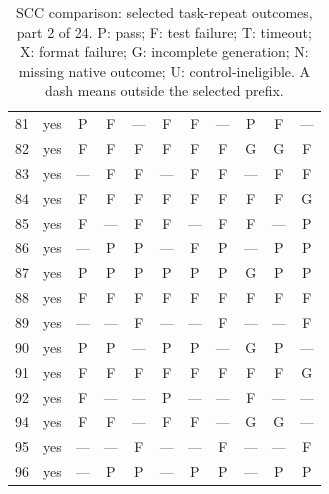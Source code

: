 \begin{table}[p]
\begin{tabular*}{\textwidth}{@{\extracolsep{\fill}}rc*{9}{c}@{}}
81 & yes & P & F & — & F & F & — & P & F & —\\
82 & yes & F & F & F & F & F & F & G & G & F\\
83 & yes & — & F & F & — & F & F & — & F & F\\
84 & yes & F & F & F & F & F & F & F & F & G\\
85 & yes & F & — & F & F & — & F & F & — & P\\
86 & yes & — & P & P & — & F & P & — & P & P\\
87 & yes & P & P & P & P & P & P & G & P & P\\
88 & yes & F & F & F & F & F & F & F & F & F\\
89 & yes & — & — & F & — & — & F & — & — & F\\
90 & yes & P & P & — & P & P & — & G & P & —\\
91 & yes & F & F & F & F & F & F & F & F & G\\
92 & yes & F & — & — & P & — & — & F & — & —\\
94 & yes & F & F & — & F & F & — & G & G & —\\
95 & yes & — & — & F & — & — & F & — & — & F\\
96 & yes & — & P & P & — & P & P & — & P & P\\
\bottomrule\end{tabular*}
\caption{SCC comparison: selected task-repeat outcomes, part 2 of 24. P: pass; F: test failure; T: timeout; X: format failure; G: incomplete generation; N: missing native outcome; U: control-ineligible. A dash means outside the selected prefix.}
\end{table}
\clearpage
